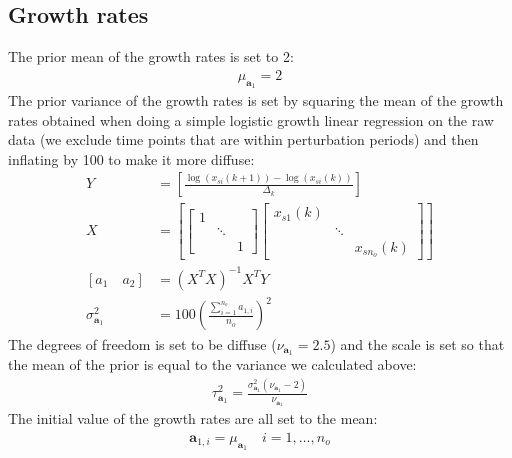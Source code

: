 \documentclass{article}
\newcommand{\growth}{\mathbf{a}_1}
\newcommand{\growthi}[1]{\mathbf{a}_{1,#1}}
\newcommand{\meangrowth}{\mu_{\growth}}
\newcommand{\vargrowth}{\sigma^2_{\growth}}
\newcommand{\dofgrowth}{\nu_{\growth}}
\newcommand{\scalegrowth}{\tau^2_{\growth}}
\newcommand{\dt}{\Delta_k}
\begin{document}
\subsection{Growth rates}
The prior mean of the growth rates is set to 2:
\begin{align}
    \meangrowth = 2
\end{align}
The prior variance of the growth rates is set by squaring the mean of the growth rates obtained when doing a simple logistic growth linear regression on the raw data (we exclude time points that are within perturbation periods) and then inflating by 100 to make it more diffuse:
\begin{align}
    Y & = \left[ \frac{\log (x_{si}(k+1)) - \log ( x_{si}(k) ) }{\dt} \right] \\
    X & = \left[
        \begin{bmatrix}
            1 & & \\
            & \ddots & \\
            & & 1
        \end{bmatrix}
        \begin{bmatrix}
            x_{s1}(k) & & \\
            & \ddots & \\
            & & x_{s n_o}(k)
        \end{bmatrix} \right] \\
    [a_1 \quad a_2] & = (X^T X)^{-1} X^T Y \\
    \vargrowth & = 100 \left( \frac{\sum_{i=1}^{n_o} a_{1,i}}{n_o} \right)^2 
\end{align}
The degrees of freedom is set to be diffuse ($\dofgrowth = 2.5 $) and the scale is set so that the mean of the prior is equal to the variance we calculated above:
\begin{align}
    \scalegrowth = \frac{\vargrowth (\dofgrowth - 2)}{\dofgrowth}
\end{align}
The initial value of the growth rates are all set to the mean:
\begin{align}
    \growthi{i} = \meangrowth \quad i = 1, \dots, n_o
\end{align}
\end{document}
